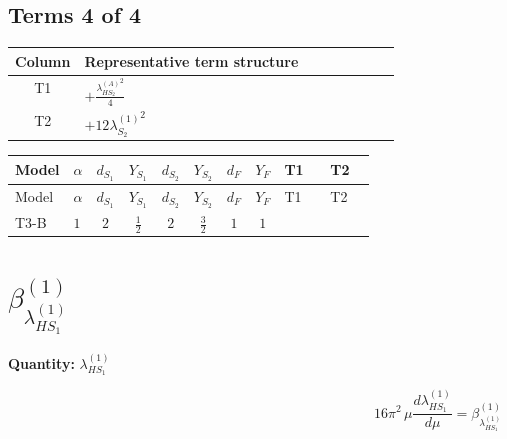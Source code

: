\documentclass[8pt]{article}
\begin{document}
\begin{landscape}
\subsection*{Terms 4 of 4}
\begin{center}
\begin{tabular}{@{}c >{\raggedright\arraybackslash}p{0.82\linewidth}@{}}
\toprule
Column & Representative term structure \\
\midrule
T1 & \(\displaystyle +\frac{{\lambda_{HS_2}^{(A)}}^2}{4}\) \\
\midrule
T2 & \(\displaystyle +12 {\lambda_{S_2}^{(1)}}^2\) \\
\midrule
\bottomrule
\end{tabular}
\end{center}
\smallskip
\tiny
\begin{longtable}{@{}llcccccc >{\raggedright\arraybackslash}p{0.21\linewidth} >{\raggedright\arraybackslash}p{0.21\linewidth}@{}}
\toprule
Model & $\alpha$ & $d_{S_1}$ & $Y_{S_1}$ & $d_{S_2}$ & $Y_{S_2}$ & $d_F$ & $Y_F$ & T1 & T2 \\
\midrule
\endfirsthead
\toprule
Model & $\alpha$ & $d_{S_1}$ & $Y_{S_1}$ & $d_{S_2}$ & $Y_{S_2}$ & $d_F$ & $Y_F$ & T1 & T2 \\
\midrule
\endhead
T3-B & $1$ & $2$ & $\frac{1}{2}$ & $2$ & $\frac{3}{2}$ & $1$ & $1$ & \scriptsize\adjustbox{max width=\linewidth}{$\begin{gathered} +\frac{{\lambda_{HS_2}^{(A)}}^2}{4}\end{gathered}$} & \scriptsize\adjustbox{max width=\linewidth}{$\begin{gathered} +12 {\lambda_{S_2}^{(1)}}^2\end{gathered}$} \\
\midrule
\bottomrule
\end{longtable}
\clearpage
\section*{$\beta_{\lambda_{HS_1}^{(1)}}^{(1)}$}
\noindent\textbf{Quantity: }$\lambda_{HS_1}^{(1)}$\par\smallskip
\[16\pi^2\,\mu\frac{d \lambda_{HS_1}^{(1)}}{d\mu}=\beta_{\lambda_{HS_1}^{(1)}}^{(1)}\]

\end{landscape}
\end{document}
